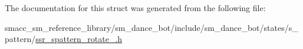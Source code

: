 The documentation for this struct was generated from the following file\+:\begin{DoxyCompactItemize}
\item 
smacc\+\_\+sm\+\_\+reference\+\_\+library/sm\+\_\+dance\+\_\+bot/include/sm\+\_\+dance\+\_\+bot/states/s\+\_\+pattern/\hyperlink{ssr__spattern__rotate__4_8h}{ssr\+\_\+spattern\+\_\+rotate\+\_.\+h}\end{DoxyCompactItemize}
